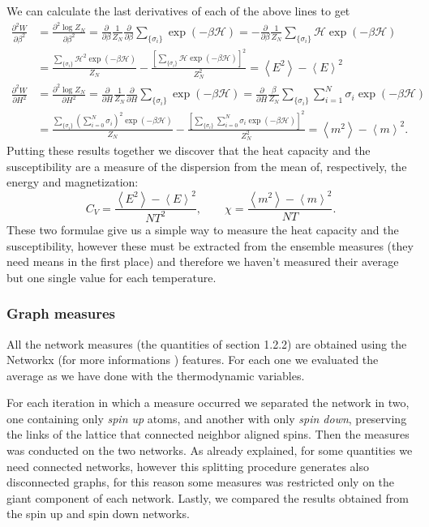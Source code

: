 We can calculate the last derivatives of each of the above lines to get 
\begin{align*}
    \frac{\partial^2 W}{\partial\beta^2}&=\frac{\partial^2 \log Z_N}{\partial\beta^2}= \frac{\partial}{\partial\beta}\frac{1}{Z_N}\frac{\partial}{\partial\beta}\sum_{\{\sigma_i\}} \exp(-\beta\mathcal{H} )=-\frac{\partial }{\partial\beta}\frac{1}{Z_N}\sum_{\{\sigma_i\}}\mathcal{H} \exp(-\beta\mathcal{H} )
    \\&=\frac{\sum_{\{\sigma_i\}}\mathcal{H}^2 \exp(-\beta\mathcal{H} )}{Z_N}-\frac{[\sum_{\{\sigma_i\}}\mathcal{H} \exp(-\beta\mathcal{H} )]^2}{Z_N^2}=\left\langle E^2 \right\rangle-\left\langle E \right\rangle^2\\
    \frac{\partial^2 W}{\partial H^2}&=\frac{\partial^2 \log Z_N}{\partial H^2}=\frac{\partial}{\partial H}\frac{1}{Z_N}\frac{\partial}{\partial H}\sum_{\{\sigma_i\}} \exp(-\beta\mathcal{H} )=\frac{\partial}{\partial H}\frac{\beta}{Z_N}\sum_{\{\sigma_i\}}\sum_{i=1}^N \sigma_i \exp(-\beta\mathcal{H} )
    \\&=\frac{\sum_{\{\sigma_i\}}(\sum_{i=0}^N\sigma_i)^2 \exp(-\beta\mathcal{H} )}{Z_N}-\frac{[\sum_{\{\sigma_i\}}\sum_{i=0}^N\sigma_i \exp(-\beta\mathcal{H} )]^2}{Z_N^2}=\left\langle m^2 \right\rangle-\left\langle m \right\rangle^2.
\end{align*}
Putting these results together we discover that the heat capacity and the susceptibility are a measure of the dispersion from the mean of, respectively, the energy and magnetization:
\begin{equation}
    C_V=\frac{\left\langle E^2 \right\rangle-\left\langle E \right\rangle^2}{NT^2},\qquad \chi=\frac{\left\langle m^2 \right\rangle-\left\langle m \right\rangle^2}{NT}.
\end{equation}
These two formulae give us a simple way to measure the heat capacity and the susceptibility, however these must be extracted from the ensemble measures (they need means in the first place) and therefore we haven't measured their average but one single value for each temperature.
\subsubsection{Graph measures}
All the network measures (the quantities of section 1.2.2) are obtained using the Networkx (for more informations \cite{Networkx}) features. For each one we evaluated the average as we have done with the thermodynamic variables.

For each iteration in which a measure occurred we separated the network in two, one containing only \emph{spin up} atoms, and another with only \emph{spin down}, preserving the links of the lattice that connected neighbor aligned spins. Then the measures was conducted on the two networks. As already explained, for some quantities we need connected networks, however this splitting procedure generates also disconnected graphs, for this reason some measures was restricted only on the giant component of each network. Lastly, we compared the results obtained from the spin up and spin down networks.